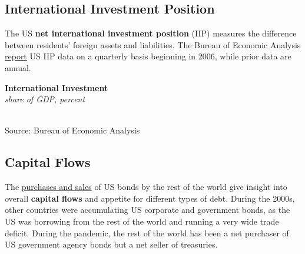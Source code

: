 \documentclass{report}
\makeatletter
\newcommand{\tbllink}[1]{\href{https://raw.githubusercontent.com/bdecon/US-chartbook/master/chartbook/data/#1}{\faTable}}
\newcommand*\short[1]{\expandafter\@gobbletwo\number\numexpr#1\relax}
\newcommand{\dateaxisticks}{
		date coordinates in=x, axis line style={draw=none},
		xmax={2022-03-15},
		max space between ticks=40,	    
		xtick={{1990-01-01}, {1992-01-01}, {1994-01-01}, 
			{1996-01-01}, {1998-01-01}, {2000-01-01}, 
			{2002-01-01}, {2004-01-01}, {2006-01-01},
			{2008-01-01}, {2010-01-01}, {2012-01-01}, {2014-01-01},
		    {2016-01-01}, {2018-01-01}, {2020-01-01}, {2022-01-01}, 
		    {2024-01-01}, {2026-01-01}},
		minor xtick={{1989-01-01}, {1991-01-01}, {1993-01-01},
			{1995-01-01}, {1997-01-01}, {1999-01-01}, 
			{2001-01-01}, {2003-01-01}, {2005-01-01}, {2007-01-01},
		    {2009-01-01}, {2011-01-01}, {2013-01-01}, {2015-01-01},
		    {2017-01-01}, {2019-01-01}, {2021-01-01}, {2023-01-01}, 
		    {2025-01-01}, {2027-01-01}},
		enlarge y limits={0.06}, enlarge x limits={0.01},
		}
\newcommand{\bbar}[2]{extra #1 ticks = {{#2}}, extra #1 tick labels = ,
		extra #1 tick style = {grid=major, grid style={thick, black!25}},}
\newcommand{\rbars}{
		\fill[color=black!10] (axis cs:{1990-07-01},\pgfkeysvalueof{/pgfplots/ymin}) rectangle 
			(axis cs:{1991-03-01}, \pgfkeysvalueof{/pgfplots/ymax});
		\fill[color=black!10] (axis cs:{2007-12-01},\pgfkeysvalueof{/pgfplots/ymin}) rectangle 
			(axis cs:{2009-07-01}, \pgfkeysvalueof{/pgfplots/ymax});
		\fill[color=black!10] (axis cs:{2001-03-01},\pgfkeysvalueof{/pgfplots/ymin}) rectangle 
			(axis cs:{2001-11-01}, \pgfkeysvalueof{/pgfplots/ymax});
		\fill[color=black!10] (axis cs:{2020-02-01},\pgfkeysvalueof{/pgfplots/ymin}) rectangle 
			(axis cs:{2020-05-01}, \pgfkeysvalueof{/pgfplots/ymax});}
\makeatother
\begin{document}
{\begin{minipage}{0.76\textwidth}
\subsection*{International Investment Position}
\vspace{-0.5mm}
\small The US \textbf{net international investment position} (IIP) measures the difference between residents' foreign assets and liabilities. The Bureau of Economic Analysis \href{https://www.bea.gov/data/intl-trade-investment/international-investment-position}{report} US IIP data on a quarterly basis beginning in 2006, while prior data are annual. 


\vspace{1mm}

\normalsize \textbf{International Investment}\\
\footnotesize{\textit{share of GDP, percent}}\\
\hspace*{-2mm} \\
\footnotesize{Source: Bureau of Economic Analysis} \hfill \tbllink{iip.csv}
\newpage
\subsection*{Capital Flows}
\vspace{-0.5mm}
\small The \href{https://home.treasury.gov/data/treasury-international-capital-tic-system}{purchases and sales} of US bonds by the rest of the world give insight into overall \textbf{capital flows} and appetite for different types of debt. During the 2000s, other countries were accumulating US corporate and government bonds, as the US was borrowing from the rest of the world and running a very wide trade deficit. During the pandemic, the rest of the world has been a net purchaser of US government agency bonds but a net seller of treasuries. 
\vspace{1mm}


\end{minipage}}
\end{document}
